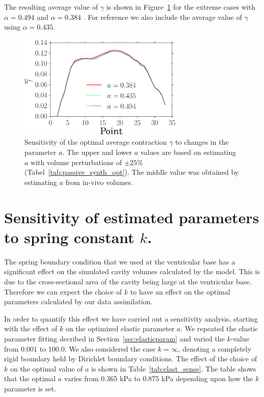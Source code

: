 The resulting average value of $\gamma$ is shown in
Figure~\ref{fig:gamma_sense_mat} for the extreme cases
with $\alpha = 0.494$ and $\alpha = 0.384$ . For reference we also include the
average value of $\gamma$ using $\alpha = 0.435$.
 
\begin{figure}[t]
\includegraphics[width=0.7\textwidth]{mean_gamma_material_parameters_fixed}
\caption{Sensitivity of the optimal average contraction $\overline{\gamma}$ to changes in the parameter $a$. The upper and lower $a$
values are based on estimating $a$ with volume perturbations of $\pm 25 \% $ (Tabel~\ref{tab:passive_synth_opt}). The middle
 value was obtained by estimating $a$ from in-vivo volumes.}
\label{fig:gamma_sense_mat}
\end{figure}


\section{Sensitivity of estimated parameters to spring constant $k$.}
\label{sec:k_sense}
The spring boundary condition that we used at the ventricular base has a significant
effect on the simulated cavity volumes calculated by the model. This is due to the 
cross-sectional area of the cavity being large at the ventricular base. Therefore 
we can expect the choice of $k$ to have an effect on the optimal parameters calculated 
by our data assimilation. 

In order to quantify this effect we have
carried out a sensitivity analysis, starting with the effect of $k$ on the optimized elastic parameter $a$.
We repeated the elastic parameter fitting decribed in Section~\ref{sec:elasticparam} and varied the $k$-value from 0.001 to 100.0.
We also considered the case $k = \infty$, denoting a completely rigid boundary held by
Dirichlet boundary conditions. The effect of the choice of $k$ on the
optimal value of $a$ is shown in Table~\ref{tab:elast_sense}. The
table shows that the optimal $a$ varies from 0.365 kPa to 0.875 kPa depending upon how the $k$ parameter is set. 

